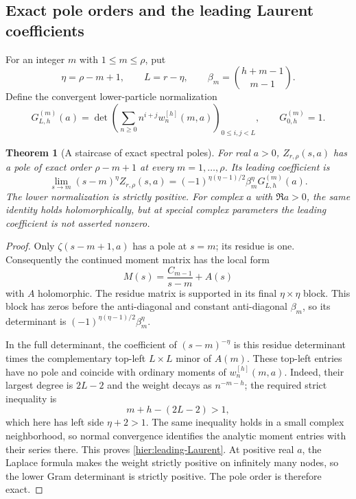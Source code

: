 \documentclass[11pt]{article}
\newtheorem{theorem}{Theorem}[section]
\theoremstyle{definition}
\theoremstyle{remark}
\numberwithin{equation}{section}
\begin{document}
\subsection{Exact pole orders and the leading Laurent coefficients}

For an integer $m$ with $1\le m\le\rho$, put
\begin{equation}\label{hier:pole-parameters}
 \eta=\rho-m+1,\qquad L=r-\eta,
 \qquad \beta_m=\binom{h+m-1}{m-1}.
\end{equation}
Define the convergent lower-particle normalization
\begin{equation}\label{hier:lower-normalization}
 G_{L,h}^{(m)}(a)=
 \det\left(\sum_{n\ge0}n^{i+j}w_n^{[h]}(m,a)\right)_{0\le i,j<L},
 \qquad G_{0,h}^{(m)}=1.
\end{equation}

\begin{theorem}[A staircase of exact spectral poles]
\label{hier:poles}
For real $a>0$, $Z_{r,\rho}(s,a)$ has a pole of exact order
$\rho-m+1$ at every $m=1,\ldots,\rho$.  Its leading coefficient is
\begin{equation}\label{hier:leading-Laurent}
 \boxed{\displaystyle
 \lim_{s\to m}(s-m)^{\eta}Z_{r,\rho}(s,a)
 =(-1)^{\eta(\eta-1)/2}\beta_m^{\eta}G_{L,h}^{(m)}(a).}
\end{equation}
The lower normalization is strictly positive.  For complex $a$ with
$\Re a>0$, the same identity holds holomorphically, but at special
complex parameters the leading coefficient is not asserted nonzero.
\end{theorem}
\begin{proof}
Only $\zeta(s-m+1,a)$ has a pole at $s=m$; its residue is one.
Consequently the continued moment matrix has the local form
\[
 M(s)=\frac{C_{m-1}}{s-m}+A(s)
\]
with $A$ holomorphic.  The residue matrix is supported in its final
$\eta\times\eta$ block.  This block has zeros before the
anti-diagonal and constant anti-diagonal $\beta_m$, so its
determinant is
$(-1)^{\eta(\eta-1)/2}\beta_m^{\eta}$.

In the full determinant, the coefficient of $(s-m)^{-\eta}$ is this
residue determinant times the complementary top-left $L\times L$
minor of $A(m)$.  These top-left entries have no pole and coincide
with ordinary moments of $w_n^{[h]}(m,a)$.  Indeed, their largest
degree is $2L-2$ and the weight decays as $n^{-m-h}$; the required
strict inequality is
\[
 m+h-(2L-2)>1,
\]
which here has left side $\eta+2>1$.  The same inequality holds in
a small complex neighborhood, so normal convergence identifies the
analytic moment entries with their series there.  This proves
\eqref{hier:leading-Laurent}.  At positive real $a$, the Laplace
formula makes the weight strictly positive on infinitely many nodes,
so the lower Gram determinant is strictly positive.  The pole order
is therefore exact.
\end{proof}
\end{document}
